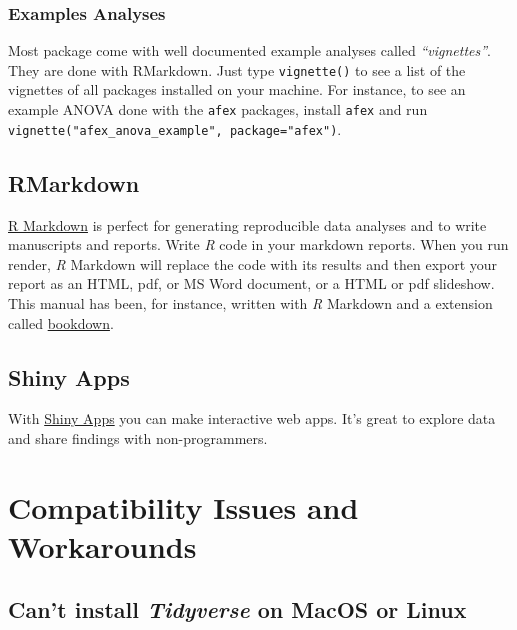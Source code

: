 \documentclass[
]{scrartcl}
\begin{document}
\subsubsection*{Examples Analyses}\label{examples-analyses}

Most package come with well documented example analyses called \emph{``vignettes''}. They are done with RMarkdown. Just type \texttt{vignette()} to see a list of the vignettes of all packages installed on your machine. For instance, to see an example ANOVA done with the \texttt{afex} packages, install \texttt{afex} and run \texttt{vignette("afex\_anova\_example",\ package="afex")}.

\subsection*{RMarkdown}\label{rmarkdown}

\href{https://rmarkdown.rstudio.com/}{R Markdown} is perfect for generating reproducible data analyses and to write manuscripts and reports. Write \emph{R} code in your markdown reports. When you run render, \emph{R} Markdown will replace the code with its results and then export your report as an HTML, pdf, or MS Word document, or a HTML or pdf slideshow. This manual has been, for instance, written with \emph{R} Markdown and a extension called \href{https://www.bookdown.org/}{bookdown}.

\subsection*{Shiny Apps}\label{shiny-apps}

With \href{https://shiny.rstudio.com/}{Shiny Apps} you can make interactive web apps. It's great to explore data and share findings with non-programmers.

\section{Compatibility Issues and Workarounds}\label{compatibility-issues-and-workarounds}

\subsection{\texorpdfstring{Can't install \emph{Tidyverse} on MacOS or Linux}{Can't install Tidyverse on MacOS or Linux}}\label{tidyverseinstall}
\end{document}
